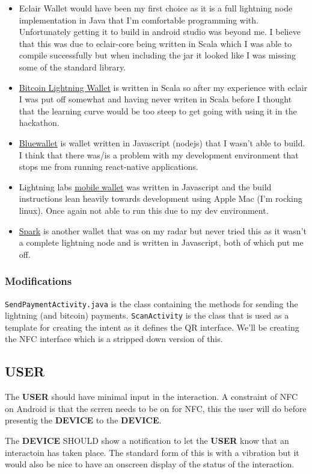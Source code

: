 \documentclass[a4paper]{article}
\begin{document}
\begin{itemize}
\item Eclair Wallet would have been my first choice as it is a full lightning node
implementation in Java that I'm comfortable programming with.  Unfortunately getting it
to build in android studio was beyond me.  I believe that this was due to eclair-core
being written in Scala which I was able to compile successfully but when including the
jar it looked like I was missing some of the standard library.

\item \href{https://github.com/btcontract/lnwallet}{Bitcoin Lightning Wallet} is written
in Scala so after my experience with eclair I was put off somewhat and having never
writen in Scala before I thought that the learning curve would be too steep to get going
with using it in the hackathon.

\item \href{https://github.com/bluewallet/bluewallet}{Bluewallet} is wallet written in
Javascript (nodejs) that I wasn't able to build. I think that there was/is a problem
with my development environment that stops me from running react-native applications.

\item Lightning labs \href{https://github.com/lightninglabs/lightning-app}{mobile wallet}
was written in Javascript and the build instructions lean heavily towards development
using Apple Mac (I'm rocking linux). Once again not able to run this due to my dev
environment.

\item \href{}{Spark} is another wallet that was on my radar but never tried this as it
wasn't a complete lightning node and is written in Javascript, both of which put me off.
\end{itemize}

\subsubsection{Modifications}
\verb|SendPaymentActivity.java| is the class containing the methods for sending the
lightning (and bitcoin) payments.
\verb|ScanActivity| is the class that is used as a template for creating the intent as
it defines the QR interface.  We'll be creating the NFC interface which is a stripped
down version of this.

\subsection{USER}
The \textbf{USER} should have minimal input in the interaction.  A constraint of NFC on Android
is that the scrren needs to be on for NFC, this the user will do before presentig the
\textbf{DEVICE} to the \textbf{DEVICE}.

The \textbf{DEVICE} SHOULD show a notification to let the \textbf{USER} know that an interactoin has
taken place.  The standard form of this is with a vibration but it would also be nice to
have an onscreen display of the status of the interaction.
\end{document}
